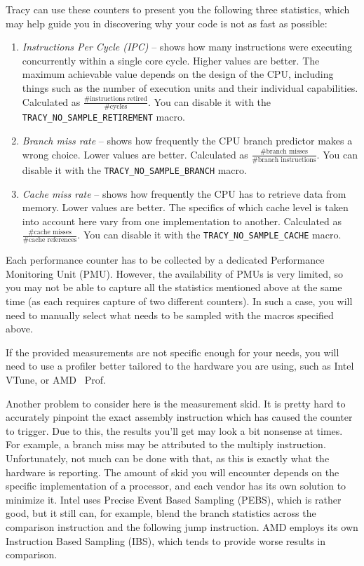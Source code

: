 \documentclass[hidelinks,titlepage,a4paper,twoside]{article}
\begin{document}
Tracy can use these counters to present you the following three statistics, which may help guide you in discovering why your code is not as fast as possible:

\begin{enumerate}
\item \emph{Instructions Per Cycle (IPC)} -- shows how many instructions were executing concurrently within a single core cycle. Higher values are better. The maximum achievable value depends on the design of the CPU, including things such as the number of execution units and their individual capabilities. Calculated as $\frac{\text{\#instructions retired}}{\text{\#cycles}}$. You can disable it with the \texttt{TRACY\_NO\_SAMPLE\_RETIREMENT} macro.
\item \emph{Branch miss rate} -- shows how frequently the CPU branch predictor makes a wrong choice. Lower values are better. Calculated as $\frac{\text{\#branch misses}}{\text{\#branch instructions}}$. You can disable it with the \texttt{TRACY\_NO\_SAMPLE\_BRANCH} macro.
\item \emph{Cache miss rate} -- shows how frequently the CPU has to retrieve data from memory. Lower values are better. The specifics of which cache level is taken into account here vary from one implementation to another. Calculated as $\frac{\text{\#cache misses}}{\text{\#cache references}}$. You can disable it with the \texttt{TRACY\_NO\_SAMPLE\_CACHE} macro.
\end{enumerate}

Each performance counter has to be collected by a dedicated Performance Monitoring Unit (PMU). However, the availability of PMUs is very limited, so you may not be able to capture all the statistics mentioned above at the same time (as each requires capture of two different counters). In such a case, you will need to manually select what needs to be sampled with the macros specified above.

If the provided measurements are not specific enough for your needs, you will need to use a profiler better tailored to the hardware you are using, such as Intel VTune, or AMD \si{\micro\relax}Prof.

Another problem to consider here is the measurement skid. It is pretty hard to accurately pinpoint the exact assembly instruction which has caused the counter to trigger. Due to this, the results you'll get may look a bit nonsense at times. For example, a branch miss may be attributed to the multiply instruction. Unfortunately, not much can be done with that, as this is exactly what the hardware is reporting. The amount of skid you will encounter depends on the specific implementation of a processor, and each vendor has its own solution to minimize it. Intel uses Precise Event Based Sampling (PEBS), which is rather good, but it still can, for example, blend the branch statistics across the comparison instruction and the following jump instruction. AMD employs its own Instruction Based Sampling (IBS), which tends to provide worse results in comparison.
\end{document}
